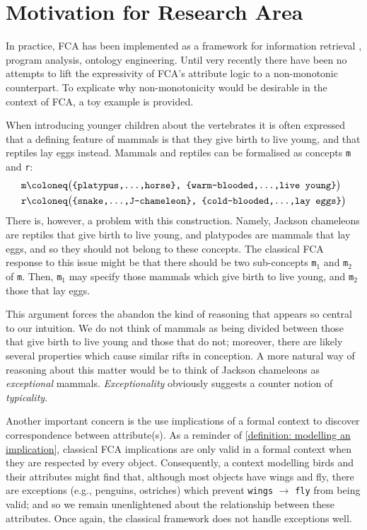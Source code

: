 \section{Motivation for Research Area}
\label{section: motivation}

In practice, FCA has been implemented as a framework for information retrieval \cite{poelmans2012text}, program analysis, ontology engineering. Until very recently \cite{carr2024nonmonotonicextensionsformalconcept,ding2024defeasiblereasoningconcepts} there have been no attempts to lift the expressivity of FCA's attribute logic to a non-monotonic counterpart. To explicate why non-monotonicity would be desirable in the context of FCA, a toy example is provided.

When introducing younger children about the vertebrates it is often expressed that a defining feature of mammals is that they give birth to live young, and that reptiles lay eggs instead. Mammals and reptiles can be formalised as concepts \texttt{m} and \texttt{r}:
\small
\[
    \begin{aligned}
         & \texttt{m} \coloneq \texttt{\big(\{platypus,\ldots,horse\}, \{warm-blooded,\ldots,live young\}\big)}  \\
         & \texttt{r} \coloneq \texttt{\big(\{snake,\ldots,J-chameleon\}, \{cold-blooded,\ldots,lay eggs\}\big)}
    \end{aligned}
\]
\normalsize
There is, however, a problem with this construction. Namely, Jackson chameleons are reptiles that give birth to live young, and platypodes are mammals that lay eggs, and so they should not belong to these concepts. The classical FCA response to this issue might be that there should be two sub-concepts \texttt{m$_1$} and \texttt{m$_2$} of \texttt{m}. Then, \texttt{m$_1$} may specify those mammals which give birth to live young, and \texttt{m$_2$} those that lay eggs.

This argument forces the abandon the kind of reasoning that appears so central to our intuition. We do not think of mammals as being divided between those that give birth to live young and those that do not; moreover, there are likely several properties which cause similar rifts in conception. A more natural way of reasoning about this matter would be to think of Jackson chameleons as \textit{exceptional} mammals. \textit{Exceptionality} obviously suggests a counter notion of \textit{typicality}.

Another important concern is the use implications of a formal context to discover correspondence between attribute(s). As a reminder of \cref{definition: modelling an implication}, classical FCA implications are only valid in a formal context when they are respected by every object. Consequently, a context modelling birds and their attributes might find that, although most objects have wings and fly, there are exceptions (e.g., penguins, ostriches) which prevent \texttt{wings} $\rightarrow$ \texttt{fly} from being valid; and so we remain unenlightened about the relationship between these attributes. Once again, the classical framework does not handle exceptions well.

